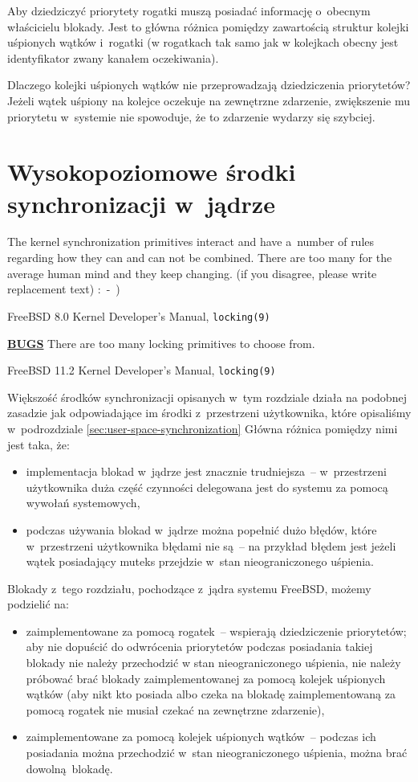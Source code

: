 \documentclass[shortabstract]{iithesis}
\theoremstyle{definition} \newtheorem*{definition}{Definicja}
\theoremstyle{definition} \newtheorem*{example}{Przykład}
\theoremstyle{definition} \newtheorem*{remark}{Uwaga}
\begin{document}
Aby dziedziczyć priorytety rogatki muszą posiadać informację o~obecnym właścicielu blokady. Jest to główna
różnica pomiędzy zawartością struktur kolejki uśpionych wątków i~rogatki (w rogatkach tak samo jak w kolejkach
obecny jest identyfikator zwany kanałem oczekiwania).

Dlaczego kolejki uśpionych wątków nie przeprowadzają dziedziczenia priorytetów? Jeżeli wątek uśpiony na kolejce
oczekuje na zewnętrzne zdarzenie, zwiększenie mu priorytetu w~systemie nie spowoduje, że to zdarzenie wydarzy
się szybciej.

\chapter{Wysokopoziomowe środki synchronizacji w~jądrze}
\label{chap:4}
\epigraph{The kernel synchronization primitives interact and have a~number of rules regarding how they can and can not
be combined. There are too many for the average human mind and they keep changing. (if you disagree, please
write replacement text) :~-~)}
{FreeBSD 8.0 Kernel Developer's Manual, \texttt{locking(9)}}

\epigraph{\underline{\textbf{BUGS}} There are too many locking primitives to choose from.}
{FreeBSD 11.2 Kernel Developer's Manual, \texttt{locking(9)}}

Większość środków synchronizacji opisanych w~tym rozdziale działa na podobnej zasadzie jak odpowiadające im środki
z~przestrzeni użytkownika, które opisaliśmy w~podrozdziale \ref{sec:user-space-synchronization}
Główna różnica pomiędzy nimi jest taka, że:
\begin{itemize}
\item implementacja blokad w~jądrze jest znacznie trudniejsza~-- w~przestrzeni użytkownika
duża część czynności delegowana jest do systemu za pomocą wywołań systemowych,
\item podczas używania blokad w~jądrze można popełnić dużo błędów, które w~przestrzeni użytkownika błędami nie są~--
na przykład błędem jest jeżeli wątek posiadający muteks przejdzie w~stan nieograniczonego uśpienia.
\end{itemize}

Blokady z~tego rozdziału, pochodzące z~jądra systemu FreeBSD, możemy podzielić na:
\begin{itemize}
\item zaimplementowane za pomocą rogatek~-- wspierają dziedziczenie priorytetów; aby nie dopuścić do
odwrócenia priorytetów podczas posiadania takiej blokady nie należy przechodzić w stan nieograniczonego uśpienia,
nie należy próbować brać blokady zaimplementowanej za
pomocą kolejek uśpionych wątków (aby nikt kto posiada albo czeka na blokadę zaimplementowaną za pomocą
rogatek nie musiał czekać na zewnętrzne zdarzenie),
\item zaimplementowane za pomocą kolejek uśpionych wątków~-- podczas ich posiadania można
przechodzić w~stan nieograniczonego uśpienia, można brać dowolną blokadę.
\end{itemize}
\end{document}

